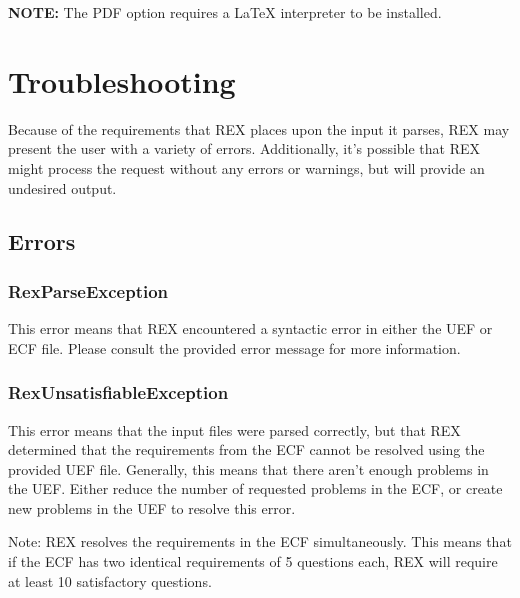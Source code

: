 \documentclass{article}
\begin{document}
\noindent \textbf{NOTE:} The PDF option requires a \LaTeX{} interpreter to be installed.

\section{Troubleshooting}
Because of the requirements that REX places upon the input it parses, REX may present the user with a variety of errors. Additionally, it's possible that REX might process the request without any errors or warnings, but will provide an undesired output.

\subsection{Errors}
\subsubsection{RexParseException}
This error means that REX encountered a syntactic error in either the UEF or ECF file. Please consult the provided error message for more information.

\subsubsection{RexUnsatisfiableException}
\label{RexUnsatisfiableException}
This error means that the input files were parsed correctly, but that
REX determined that the requirements from the ECF cannot be resolved
using the provided UEF file. Generally, this means that there aren't
enough problems in the UEF. Either reduce the number of requested
problems in the ECF, or create new problems in the UEF to resolve
this error.

Note: REX resolves the requirements in the ECF simultaneously. This means
that if the ECF has two identical requirements of 5 questions each, REX
will require at least 10 satisfactory questions.



\end{document}
